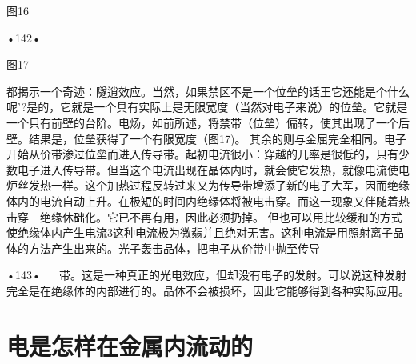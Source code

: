  

图16

•142•
  
 

图17

都揭示一个奇迹：隧逍效应。当然，如果禁区不是一个位垒的话王它还能是个什么呢'?是的，它就是一个具有实际上是无限宽度（当然对电子来说）的位垒。它就是一个只有前壁的台阶。电炀，如前所述，将禁带（位垒）偏转，使其出现了一个后壁。结果是，位垒获得了一个有限宽度（图17)。
其余的则与金屈完全相同。电子开始从价带渗过位垒而进入传导带。起初电流很小：穿越的几率是很低的，只有少数电子进入传导带。但当这个电流出现在晶体内时，就会使它发热，就像电流使电炉丝发热一样。这个加热过程反转过来又为传导带增添了新的电子大军，因而绝缘体内的电流自动上升。在极短的时间内绝缘体将被电击穿。而这一现象又伴随着热击穿－绝缘休础化。它已不再有用，因此必须扔掉。
但也可以用比较缓和的方式使绝缘体内产生电流3这种电流极为微翡并且绝对无害。这种电流是用照射离子品体的方法产生出来的。光子轰击品体，把电子从价带中抛至传导

•143•
  
带。这是一种真正的光电效应，但却没有电子的发射。可以说这种发射完全是在绝缘体的内部进行的。晶体不会被损坏，因此它能够得到各种实际应用。

\section{电是怎样在金属内流动的}

